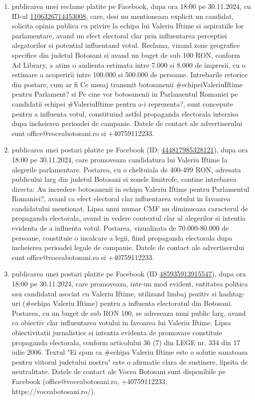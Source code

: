 \documentclass[a4paper,12pt]{article}
\begin{document}
\begin{enumerate}[leftmargin=*, label=\arabic*.)]
    \item publicarea unei reclame platite pe Facebook, dupa ora 18:00 pe 30.11.2024, cu ID-ul \href{https://www.facebook.com/ads/library/?id=1106326714453008}{1106326714453008}, care, desi nu mentioneaza explicit un candidat, solicita opinia publica cu privire la echipa lui Valeriu Iftime si aspiratiile lor parlamentare, avand un efect electoral clar prin influentarea perceptiei alegatorilor si potential influentand votul.  Reclama, vizand zone geografice specifice din judetul Botosani si avand un buget de sub 100 RON, conform Ad Library, a atins o audienta estimata intre 7.000 si 8.000 de impresii, cu o estimare a acoperirii intre 100.000 si 500.000 de persoane.  Intrebarile retorice din postare, cum ar fi Ce mesaj transmit botosanenii \#echipeiValeriuIftime pentru Parlament? si Pe cine vor botosanenii in Parlamentul Romaniei pe candidatii echipei \#ValeriuIftime pentru a-i reprezenta?, sunt concepute pentru a influenta votul, constituind astfel propaganda electorala interzisa dupa incheierea perioadei de campanie.  Datele de contact ale advertiserului sunt office@voceabotosani.ro si +40759112233.
    \item publicarea unei postari platite pe Facebook (ID: \href{https://www.facebook.com/ads/library/?id=444817985328121}{444817985328121}), dupa ora 18:00 pe 30.11.2024, care promoveaza candidatura lui Valeriu Iftime la alegerile parlamentare. Postarea, cu o cheltuiala de 400-499 RON,  adresata publicului larg din judetul Botosani si zonele limitrofe, contine intrebarea directa: Au incredere botosanenii in echipa Valeriu Iftime pentru Parlamentul Romaniei?, avand ca efect electoral clar influentarea votului in favoarea candidatului mentionat.  Lipsa unui numar CMF nu diminueaza caracterul de propaganda electorala, avand in vedere contextul clar al alegerilor si intentia evidenta de a influenta votul.  Postarea, vizualizata de 70.000-80.000 de persoane,  constituie o incalcare a legii, fiind propaganda electorala dupa incheierea perioadei legale de campanie.  Datele de contact ale advertiserului sunt office@voceabotosani.ro si +40759112233.
    \item publicarea unei postari platite pe Facebook (ID \href{https://www.facebook.com/ads/library/?id=485935913915547}{485935913915547}), dupa ora 18:00 pe 30.11.2024, care promoveaza, intr-un mod evident, entitatea politica sau candidatul asociat cu Valeriu Iftime, utilizand limbaj pozitiv si hashtag-uri (\#echipa Valeriu Iftime) pentru a influenta electoratul din Botosani.  Postarea, cu un buget de sub RON 100,  se adreseaza unui public larg, avand ca obiectiv clar influentarea votului in favoarea lui Valeriu Iftime.  Lipsa obiectivitatii jurnalistice si intentia evidenta de promovare constituie propaganda electorala, conform articolului 36 (7) din LEGE nr. 334 din 17 iulie 2006.  Textul "Ei spun ca \#echipa Valeriu Iftime este o solutie sanatoasa pentru viitorul judetului nostru" este o afirmatie clara de sustinere, lipsita de neutralitate.  Datele de contact ale Vocea Botosani sunt disponibile pe Facebook (office@voceabotosani.ro, +40759112233, https://voceabotosani.ro/).
\end{enumerate}
\end{document}
